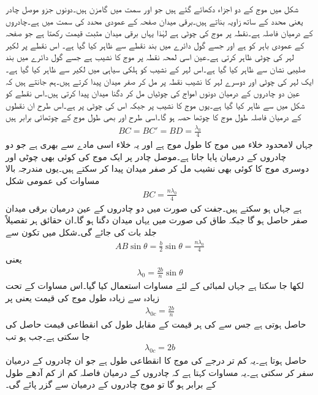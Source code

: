 شکل  میں  موج کے دو  اجزاء دکھائے گئے ہیں جو  اور  سمت میں گامزن ہیں۔دونوں جزو موصل چادر یعنی  محدد کے ساتھ  زاویہ بناتے ہیں۔برقی میدان صفحہ کے عمودی  محدد کی سمت میں ہے۔چادروں کے درمیان فاصلہ  ہے۔نقطہ  پر موج  کی چوٹی ہے لہٰذا یہاں برقی میدان  مثبت  قیمت رکھتا ہے جو صفحہ کے عمودی باہر کو ہے اور جسے گول دائرے میں بند نقطے سے ظاہر کیا گیا ہے۔ اس نقطے پر لکیر  لہر کی چوٹی ظاہر کرتی ہے۔عین اسی لمحہ نقطہ  پر موج  کا نشیب ہے جسے گول دائرے میں بند صلیبی نشان سے ظاہر کیا گیا ہے۔اس لہر کے نشیب کو ہلکی سیاہی میں لکیر  سے ظاہر کیا گیا ہے۔ایک لہر کی چوٹی اور دوسرے لہر کا نشیب نقطہ  پر مل کر صفر میدان پیدا کرتے ہیں۔ہم جانتے ہیں کہ عین دو چادروں کے درمیان دونوں امواج کی چوٹیاں مل کر دگنا میدان پیدا کرتی ہیں۔اس نقطے کو شکل میں  سے ظاہر کیا گیا ہے۔یوں موج  کا نشیب  پر جبکہ اس کی چوٹی  پر ہے۔اس طرح ان نقطوں کے درمیان فاصلہ طول موج کا چوتھا حصہ ہو گا۔اسی طرح  اور  بھی طول موج کے چوتھائی برابر  ہیں
\begin{align}
BC=BC'=BD=\frac{\lambda_0}{4}
\end{align}
جہاں لامحدود خلاء میں  موج کا طول موج  ہے اور یہ خلاء اسی مادے سے بھری ہے جو دو چادروں کے درمیان پایا جاتا ہے۔موصل چادر پر ایک موج کی کوئی بھی چوٹی اور دوسری موج کا کوئی بھی نشیب مل کر صفر میدان پیدا کر سکتے ہیں۔یوں مندرجہ بالا مساوات کی عمومی شکل
\begin{align}\label{مساوات_مویج_چوٹی_نشیب_ختم_عمومی}
BC=\frac{n \lambda_0}{4}
\end{align}
ہے جہاں  ہو سکتے ہیں۔جفت  کی صورت میں دو چادروں کے عین درمیان برقی میدان صفر حاصل ہو گا جبکہ طاق  کی صورت میں یہاں میدان دگنا ہو گا۔ان حقائق ہر تفصیلاً جلد بات کی جائے گی۔شکل  میں تکون  سے
\begin{align*}
AB \sin \theta = \frac{b}{2}\sin \theta =\frac{n \lambda_0}{4}
\end{align*}
یعنی
\begin{align}\label{مساوات_مویج_طول_اور_درجہ_انداز}
\lambda_0 = \frac{2b}{n} \sin \theta
\end{align}
لکھا جا سکتا ہے جہاں لمبائی  کے لئے مساوات  استعمال کیا گیا۔اس مساوات کے تحت زیادہ سے زیادہ طول موج  کی قیمت  یعنی  پر
\begin{align}\label{مساوات_مویج_طول_موج_بالمقابل_درجہ_موج}
\lambda_{0c}=\frac{2b}{n}
\end{align}
 حاصل ہوتی ہے جس سے  کی ہر قیمت کے مقابل طول کی انقطاعی قیمت حاصل کی جا سکتی ہے۔جب  ہو تب
 \begin{align}\label{مساوات_مویج_دو_چادر_انقطاعی_طول_موج}
\lambda_{0c}=2b
\end{align}
حاصل ہوتا ہے۔یہ کم تر درجے کی  موج کا انقطاعی طول ہے جو ان چادروں کے درمیان سفر کر سکتی ہے۔یہ مساوات کہتا ہے کہ چادروں کے درمیان فاصلہ کم از کم آدھے طول کے برابر ہو گا تو موج چادروں کے درمیان سے گزر پائے گی۔

